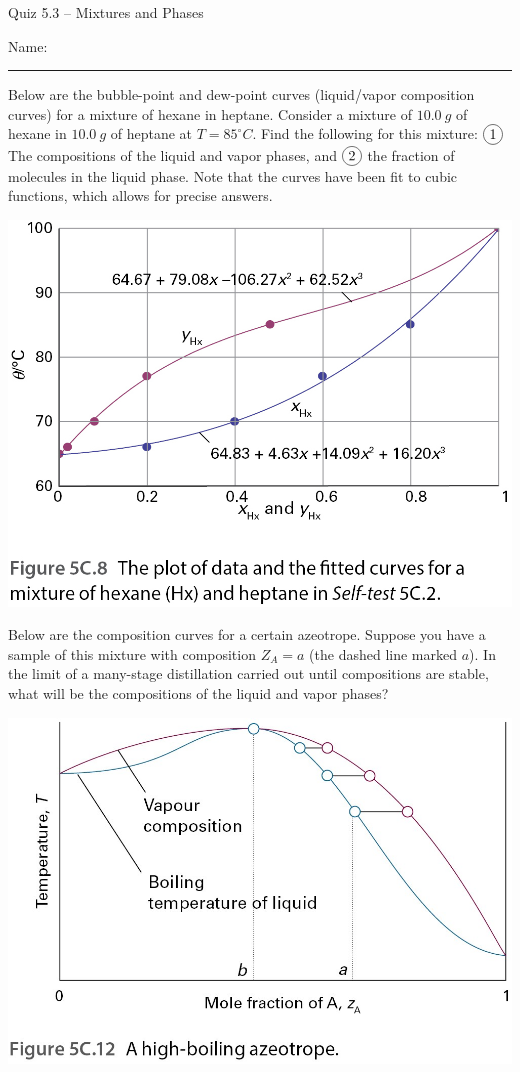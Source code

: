 \documentclass[11pt, letterpaper]{memoir}
\begin{document}
	\begin{center}
		{\large Quiz 5.3 -- Mixtures and Phases}
	\end{center}
	{\large Name: \rule[-1mm]{4in}{.1pt} 
		


Below are the bubble-point and dew-point curves (liquid/vapor composition curves) for a mixture of hexane in heptane. Consider a mixture of $10.0~g$ of hexane in $10.0~g$ of heptane at $T=85^\circ C$. Find the following for this mixture: $\circled{1}$ The compositions of the liquid and vapor phases, and $\circled{2}$ the fraction of molecules in the liquid phase. Note that the curves have been fit to cubic functions, which allows for precise answers.

\noindent\includegraphics[width=0.7\linewidth]{Mixture_Curve}

\vspace{35em}


Below are the composition curves for a certain azeotrope. Suppose you have a sample of this mixture with composition $Z_A = a$ (the dashed line marked $a$). In the limit of a many-stage distillation carried out until compositions are stable, what will be the compositions of the liquid and vapor phases?

\noindent\includegraphics[width=0.5\linewidth]{Azeotrope}



}
\end{document}
